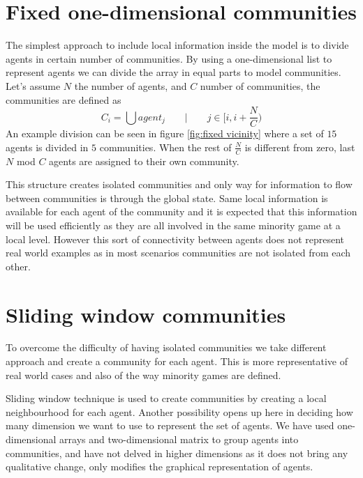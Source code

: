 \section{Fixed one-dimensional communities}
\label{sec:fixed communities}

The simplest approach to include local information inside the model is to divide agents in certain number of communities.
By using a one-dimensional list to represent agents we can divide the array in equal parts to model communities.
Let's assume $N$ the number of agents, and $C$ number of communities, the communities are defined as
\begin{displaymath}
C_i = \bigcup agent_j \qquad|\qquad j\in [i, i+\frac{N}{C})
\end{displaymath}
An example division can be seen in figure \ref{fig:fixed vicinity} where a set of $15$ agents is divided in $5$ communities.
When the rest of $\frac{N}{C}$ is different from zero, last $N$ mod $C$ agents are assigned to their own community.



This structure creates isolated communities and only way for information to flow between communities is through the global state.
Same local information is available for each agent of the community and it is expected that this information will be used efficiently as they are all involved in the same minority game at a local level. 
However this sort of connectivity between agents does not represent real world examples as in most scenarios communities are not isolated from each other.

\section{Sliding window communities}
\label{sec:sliding communities}

To overcome the difficulty of having isolated communities we take different approach and create a community for each agent.
This is more representative of real world cases and also of the way minority games are defined.

Sliding window technique is used to create communities by creating a local neighbourhood for each agent.
Another possibility opens up here in deciding how many dimension we want to use to represent the set of agents.
We have used one-dimensional arrays and two-dimensional matrix to group agents into communities, and have not delved in higher dimensions as it does not bring any qualitative change, only modifies the graphical representation of agents.

